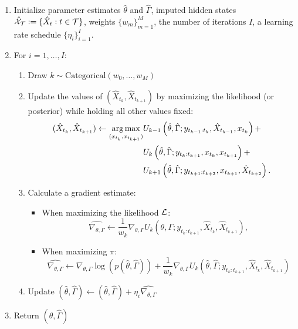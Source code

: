 \begin{enumerate}
    \item Initialize parameter estimates $\hat \theta$ and $\hat \Gamma$, imputed hidden states $\hat {\mathcal{X}}_{\mathcal{T}} := \{\hat X_{t} : t \in \mathcal{T}\}$, weights $\{w_m\}_{m=1}^M$, the number of iterations $I$, a learning rate schedule $\{\eta_i\}_{i=1}^I$.
    \item For $i = 1,\ldots,I$:
    \begin{enumerate}
        \item Draw $k \sim \text{Categorical}\left(w_0,\ldots,w_M\right)$
        \item Update the values of $(\hat X_{t_k}, \hat X_{t_{k+1}})$ by maximizing the likelihood (or posterior) while holding all other values fixed:
        \begin{align*}
            (\hat X_{t_k},\hat X_{t_{k+1}}) \leftarrow \operatorname*{arg\,max}_{(x_{t_k},x_{t_{k+1}})} & U_{k-1} \left(\hat \theta,\hat \Gamma ; y_{t_{k-1}:t_k},\hat X_{t_{k-1}}, x_{t_k}\right) + \\
            & U_{k} \left(\hat \theta,\hat \Gamma;y_{t_{k}:t_{k+1}},x_{t_{k}}, x_{t_{k+1}}\right) + \\
            & U_{k+1} \left(\hat \theta, \hat \Gamma;y_{t_{k+1}:t_{k+2}}, x_{t_{k+1}}, \hat X_{t_{k+2}}\right).
        \end{align*}
        \item Calculate a gradient estimate:
        \begin{itemize}
            \item When maximizing the likelihood $\mathcal{L}$:
            \begin{equation*}
                \widehat{\nabla_{\theta,\Gamma}} \leftarrow \frac{1}{w_k} \nabla_{\theta,\Gamma} U_{k} \left(\theta,\Gamma;y_{t_{k}:t_{k+1}},\hat X_{t_{k}}, \hat X_{t_{k+1}}\right), 
            \end{equation*}
            \item When maximizing $\pi$:
            \begin{equation*}
                \widehat{\nabla_{\theta,\Gamma}} \leftarrow \nabla_{\theta,\Gamma} \log(p(\hat \theta,\hat \Gamma)) +  \frac{1}{w_k} \nabla_{\theta,\Gamma} U_{k} \left(\hat \theta,\hat \Gamma;y_{t_{k}:t_{k+1}}, \hat X_{t_{k}}, \hat X_{t_{k+1}}\right)
            \end{equation*}
        \end{itemize}
        \item Update $(\hat \theta,\hat \Gamma) \leftarrow (\hat \theta,\hat \Gamma) + \eta_i \widehat{\nabla_{\theta,\Gamma}}$
    \end{enumerate}
    \item Return $(\hat \theta,\hat \Gamma)$
\end{enumerate}